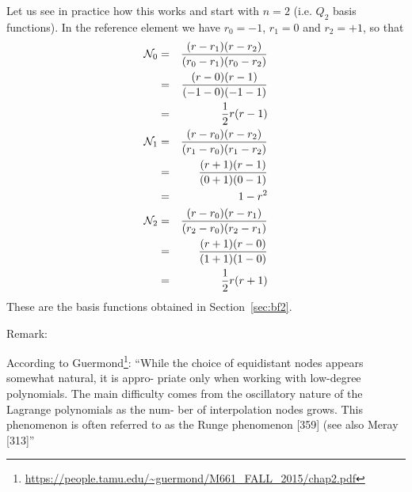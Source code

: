 Let us see in practice how this works and start with $n=2$ (i.e. $Q_2$ basis functions).
In the reference element we have $r_0=-1$, $r_1=0$ and $r_2=+1$, so that 
\begin{eqnarray}
{\mathcal{N}}_0 
&=& \frac{(r-r_1)(r-r_2)}{(r_0-r_1)(r_0-r_2)} \nonumber\\
&=& \frac{(r-0)(r-1)}{(-1-0)(-1-1)} \nonumber\\
&=& \frac12 r(r-1) \nonumber\\
{\mathcal{N}}_1
&=& \frac{(r-r_0)(r-r_2)}{(r_1-r_0)(r_1-r_2)} \nonumber\\
&=& \frac{(r+1)(r-1)}{(0+1)(0-1)} \nonumber\\
&=& 1-r^2 \nonumber\\
{\mathcal{N}}_2 
&=& \frac{(r-r_0)(r-r_1)}{(r_2-r_0)(r_2-r_1)} \nonumber\\
&=& \frac{(r+1)(r-0)}{(1+1)(1-0)} \nonumber\\
&=& \frac12 r(r+1) 
\end{eqnarray}
These are the basis functions obtained in Section~\ref{sec:bf2}.













\newpage

Remark:

According to Guermond\footnote{\url{https://people.tamu.edu/~guermond/M661_FALL_2015/chap2.pdf}}:
``While the choice of equidistant nodes appears somewhat natural, it is appro-
priate only when working with low-degree polynomials. The main diﬃculty
comes from the oscillatory nature of the Lagrange polynomials as the num-
ber of interpolation nodes grows. This phenomenon is often referred to as the
Runge phenomenon [359] (see also Meray [313]''

